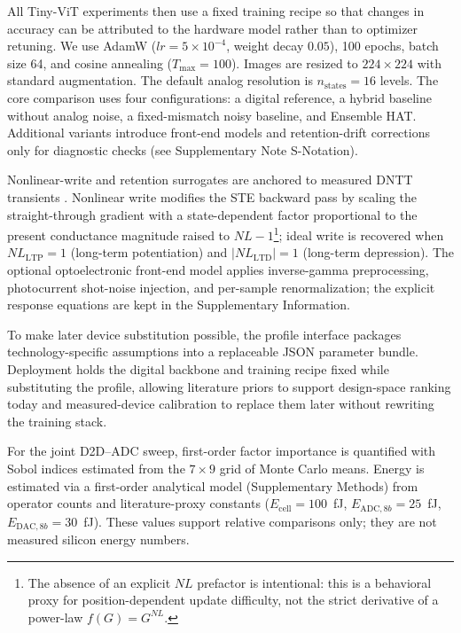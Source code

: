 All Tiny-ViT experiments then use a fixed training recipe so that changes in accuracy can be attributed to the hardware model rather than to optimizer retuning. We use AdamW ($lr = 5\times10^{-4}$, weight decay $0.05$), 100 epochs, batch size 64, and cosine annealing ($T_{\max}=100$). Images are resized to $224\times224$ with standard augmentation. The default analog resolution is $n_{\mathrm{states}}=16$ levels. The core comparison uses four configurations: a digital reference, a hybrid baseline without analog noise, a fixed-mismatch noisy baseline, and Ensemble HAT. Additional variants introduce front-end models and retention-drift corrections only for diagnostic checks (see Supplementary Note S-Notation).

Nonlinear-write and retention surrogates are anchored to measured DNTT transients \citep{vincze2025dualplasticity}. Nonlinear write modifies the STE backward pass by scaling the straight-through gradient with a state-dependent factor proportional to the present conductance magnitude raised to $NL-1$\footnote{The absence of an explicit $NL$ prefactor is intentional: this is a behavioral proxy for position-dependent update difficulty, not the strict derivative of a power-law $f(G)=G^{NL}$.}; ideal write is recovered when $NL_{\mathrm{LTP}}=1$ (long-term potentiation) and $|NL_{\mathrm{LTD}}|=1$ (long-term depression). The optional optoelectronic front-end model applies inverse-gamma preprocessing, photocurrent shot-noise injection, and per-sample renormalization; the explicit response equations are kept in the Supplementary Information.

To make later device substitution possible, the profile interface packages technology-specific assumptions into a replaceable JSON parameter bundle. Deployment holds the digital backbone and training recipe fixed while substituting the profile, allowing literature priors to support design-space ranking today and measured-device calibration to replace them later without rewriting the training stack.

For the joint D2D--ADC sweep, first-order factor importance is quantified with Sobol indices estimated from the $7 \times 9$ grid of Monte Carlo means. Energy is estimated via a first-order analytical model (Supplementary Methods) from operator counts and literature-proxy constants ($E_{\text{cell}}=100$~fJ, $E_{\text{ADC},8b}=25$~fJ, $E_{\text{DAC},8b}=30$~fJ). These values support relative comparisons only; they are not measured silicon energy numbers.
